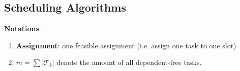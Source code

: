 \subsection{Scheduling Algorithms}\label{schedule algorithm}


\textbf{Notations}.
\begin{enumerate}
    \item \textbf{Assignment}: one feasible assignment (i.e. assign one task to one slot)
    \item $m=\sum \left |  \mathcal{T}_{k} \right |$ denote the amount of all dependent-free tasks.
\end{enumerate}




